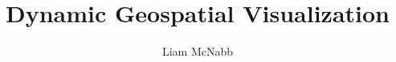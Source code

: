 \documentclass[hyperpdf,twoside]{hepthesis}
\title{Dynamic Geospatial Visualization}
\author{Liam McNabb}
\begin{document}
\small
\begin{frontmatter}
  
\end{frontmatter}

\begin{mainmatter}
 
 
 
 
 
 
 
 
\end{mainmatter}
 
\begin{appendices}
	
  
\end{appendices}

\begin{backmatter}
  
\end{backmatter}

\end{document}
